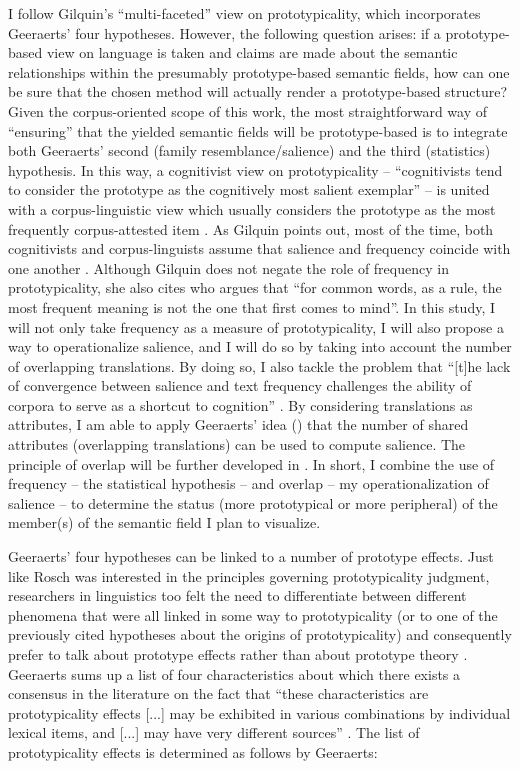 I follow Gilquin’s “multi-faceted” view on prototypicality, which incorporates Geeraerts' four hypotheses. However, the following question arises: if a pro\-to\-type-based view on language is taken and claims are made about the semantic relationships within the presumably prototype-based semantic fields, how can one be sure that the chosen method will actually render a prototype-based structure? Given the corpus-oriented scope of this work, the most straightforward way of ``ensuring'' that the yielded semantic fields will be prototype-based is to integrate both Geeraerts’ second (family resemblance\slash salience) and the third (statistics) hypothesis. In this way, a cognitivist view on prototypicality – “cognitivists tend to consider the prototype as the cognitively most salient exemplar” \citep[159]{gilquin_place_2006} – is united with a corpus-linguistic view which usually considers the prototype as the most frequently corpus-attested item \citep{gilquin_place_2006}. As Gilquin points out, most of the time, both cognitivists and corpus-linguists assume that salience and frequency coincide with one another \citep{gilquin_place_2006}. Although Gilquin does not negate the role of frequency in prototypicality, she also cites \citet[36]{sinclair_corpus_1991} who argues that “for common words, as a rule, the most frequent meaning is not the one that first comes to mind”. In this study, I will not only take frequency as a measure of prototypicality, I will also propose a way to operationalize salience, and I will do so by taking into account the number of overlapping translations. By doing so, I also tackle the problem that “[t]he lack of convergence between salience and text frequency challenges the ability of corpora to serve as a shortcut to cognition” \citep[9]{arppe_cognitive_2010}. By considering translations as attributes, I am able to apply Geeraerts' idea (\citeyear[29]{geeraerts_where_2006}) that the number of shared attributes (overlapping translations) can be used to compute salience. The principle of overlap will be further developed in . In short, I combine the use of frequency – the statistical hypothesis – and overlap – my operationalization of salience – to determine the status (more prototypical or more peripheral) of the member(s) of the semantic field I plan to visualize.

Geeraerts’ four hypotheses can be linked to a number of prototype effects. Just like Rosch was interested in the principles governing prototypicality judgment, researchers in linguistics too felt the need to differentiate between different phenomena that were all linked in some way to prototypicality (or to one of the previously cited hypotheses about the origins of prototypicality) and consequently prefer to talk about prototype effects rather than about prototype theory \citep[578]{allan_lexical_2013}. Geeraerts sums up a list of four characteristics about which there exists a consensus in the literature on the fact that “these characteristics are prototypicality effects [...] may be exhibited in various combinations by individual lexical items, and [...] may have very different sources” \citep[578]{allan_lexical_2013}. The list of prototypicality effects is determined as follows by Geeraerts:

